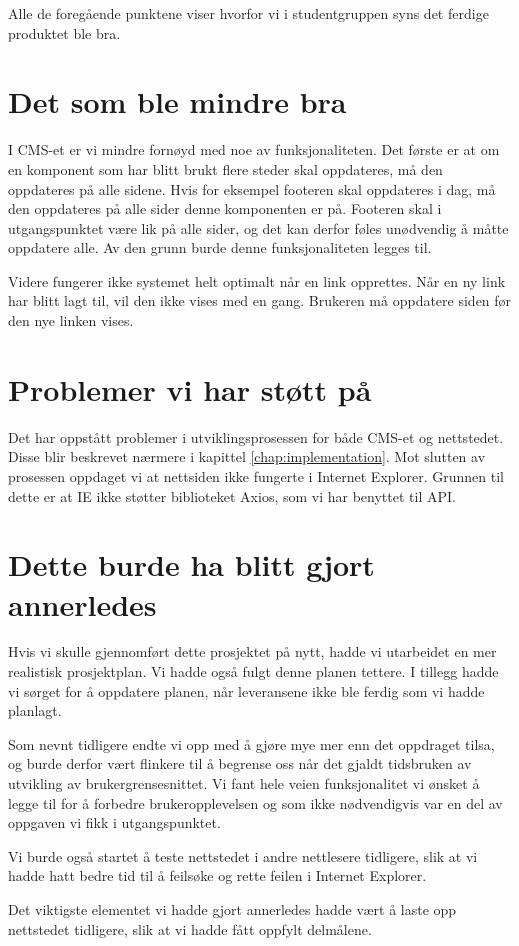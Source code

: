 Alle de foregående punktene viser hvorfor vi i studentgruppen syns det ferdige produktet ble bra.

\section{Det som ble mindre bra}
I CMS-et er vi mindre fornøyd med noe av funksjonaliteten. Det første er at om en komponent som har blitt brukt flere steder skal oppdateres, må den oppdateres på alle sidene. Hvis for eksempel footeren skal oppdateres i dag, må den oppdateres på alle sider denne komponenten er på. Footeren skal i utgangspunktet være lik på alle sider, og det kan derfor føles unødvendig å måtte oppdatere alle. Av den grunn burde denne funksjonaliteten legges til.

Videre fungerer ikke systemet helt optimalt når en link opprettes. Når en ny link har blitt lagt til, vil den ikke vises med en gang. Brukeren må oppdatere siden før den nye linken vises.

\section{Problemer vi har støtt på}
Det har oppstått problemer i utviklingsprosessen for både CMS-et og nettstedet. Disse blir beskrevet nærmere i kapittel \ref{chap:implementation}.  Mot slutten av prosessen oppdaget vi at nettsiden ikke fungerte i Internet Explorer. Grunnen til dette er at IE ikke støtter biblioteket Axios, som vi har benyttet til API. 

\section{Dette burde ha blitt gjort annerledes}
Hvis vi skulle gjennomført dette prosjektet på nytt, hadde vi utarbeidet en mer realistisk prosjektplan. Vi hadde også fulgt denne planen tettere. I tillegg hadde vi sørget for å oppdatere planen, når leveransene ikke ble ferdig som vi hadde planlagt.

Som nevnt tidligere endte vi opp med å gjøre mye mer enn det oppdraget tilsa, og burde derfor vært flinkere til å begrense oss når det gjaldt tidsbruken av utvikling av brukergrensesnittet. Vi fant hele veien funksjonalitet vi ønsket å legge til for å forbedre brukeropplevelsen og som ikke nødvendigvis var en del av oppgaven vi fikk i utgangspunktet. 

Vi burde også startet å teste nettstedet i andre nettlesere tidligere, slik at vi hadde hatt bedre tid til å feilsøke og rette feilen i Internet Explorer.

Det viktigste elementet vi hadde gjort annerledes hadde vært å laste opp nettstedet tidligere, slik at vi hadde fått oppfylt delmålene. 
